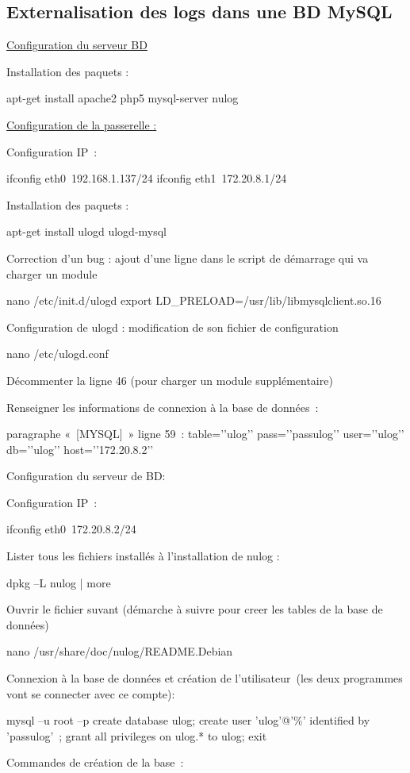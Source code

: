 \documentclass[12pt]{report}
\begin{document}
\begin{itemize}
\chapter{Externalisation des logs dans une BD MySQL}
\underline{Configuration du serveur BD}

Installation des paquets :

apt-get install apache2 php5 mysql-server nulog

\underline{Configuration de la passerelle :}

Configuration IP :

ifconfig eth0 192.168.1.137/24
ifconfig eth1 172.20.8.1/24

Installation des paquets :

apt-get install ulogd ulogd-mysql

Correction d'un bug : ajout d’une ligne dans le script de démarrage qui va charger un module

nano /etc/init.d/ulogd
export LD_PRELOAD=/usr/lib/libmysqlclient.so.16

Configuration de ulogd : modification de son fichier de configuration

nano /etc/ulogd.conf

Décommenter la ligne 46 (pour charger un module supplémentaire)

Renseigner les informations de connexion à la base de données :

paragraphe « [MYSQL] » ligne 59 :
table=’’ulog’’
pass=’’passulog’’
user=’’ulog’’
db=’’ulog’’
host=’’172.20.8.2’’

Configuration du serveur de BD:

Configuration IP :

ifconfig eth0 172.20.8.2/24

Lister tous les fichiers installés à l’installation de nulog :

dpkg –L nulog | more

Ouvrir le fichier suvant (démarche à suivre pour creer les tables de la base de données)

nano /usr/share/doc/nulog/README.Debian

Connexion à la base de données et création de l’utilisateur (les deux programmes vont se connecter avec ce compte):

mysql –u root –p
create database ulog;
create user 'ulog'@'\%' identified by 'passulog' ;
grant all privileges on ulog.* to ulog;
exit

Commandes de création de la base :


\end{itemize}
\end{document}
